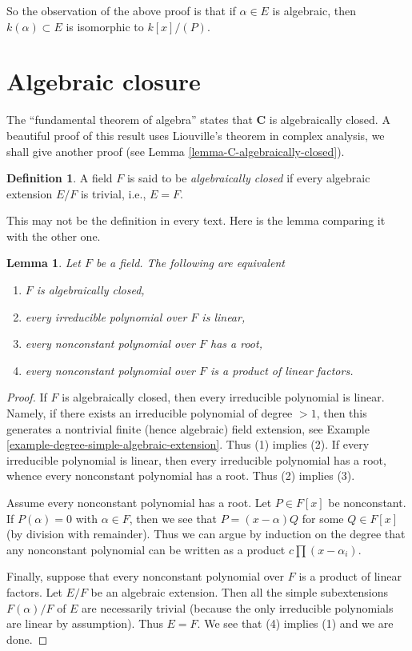 \documentclass{stacks-project}
\theoremstyle{plain}
\newtheorem{lemma}[subsection]{Lemma}
\theoremstyle{definition}
\newtheorem{definition}[subsection]{Definition}
\theoremstyle{remark}
\numberwithin{equation}{subsection}
\begin{document}
\noindent
So the observation of the above proof is that if $\alpha \in E$ is algebraic,
then $k(\alpha) \subset E$ is isomorphic to $k[x]/(P)$.


\section{Algebraic closure}
\label{section-algebraic-closure}

\noindent
The ``fundamental theorem of algebra'' states that $\mathbf{C}$ is
algebraically closed. A beautiful proof of this result uses
Liouville's theorem in complex analysis, we shall give another
proof (see Lemma \ref{lemma-C-algebraically-closed}).

\begin{definition}
\label{definition-algebraically-closed}
A field $F$ is said to be {\it algebraically closed} if every algebraic
extension $E/F$ is trivial, i.e., $E = F$.
\end{definition}

\noindent
This may not be the definition in every text. Here is the lemma comparing
it with the other one.

\begin{lemma}
\label{lemma-algebraically-closed}
Let $F$ be a field. The following are equivalent
\begin{enumerate}
\item $F$ is algebraically closed,
\item every irreducible polynomial over $F$ is linear,
\item every nonconstant polynomial over $F$ has a root,
\item every nonconstant polynomial over $F$ is a product of linear factors.
\end{enumerate}
\end{lemma}

\begin{proof}
If $F$ is algebraically closed, then every irreducible polynomial is linear.
Namely, if there exists an irreducible polynomial of degree $> 1$, then
this generates a nontrivial finite (hence algebraic) field extension, see
Example \ref{example-degree-simple-algebraic-extension}.
Thus (1) implies (2). If every irreducible polynomial
is linear, then every irreducible polynomial has a root, whence every
nonconstant polynomial has a root. Thus (2) implies (3).

\medskip\noindent
Assume every nonconstant polynomial has a root. Let $P \in F[x]$
be nonconstant. If $P(\alpha) = 0$ with $\alpha \in F$, then we see
that $P = (x - \alpha)Q$ for some $Q \in F[x]$ (by division with remainder).
Thus we can argue by induction on the degree that any nonconstant
polynomial can be written as a product $c \prod (x - \alpha_i)$.

\medskip\noindent
Finally, suppose that every nonconstant polynomial over $F$ is a product of
linear factors. Let $E/F$ be an algebraic extension. Then all the simple
subextensions $F(\alpha)/F$ of $E$ are necessarily trivial (because the
only irreducible polynomials are linear by assumption). Thus $E = F$.
We see that (4) implies (1) and we are done.
\end{proof}
\end{document}
